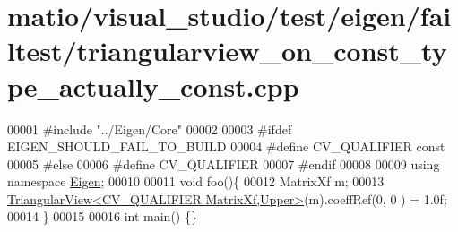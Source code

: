 \hypertarget{matio_2visual__studio_2test_2eigen_2failtest_2triangularview__on__const__type__actually__const_8cpp_source}{}\section{matio/visual\+\_\+studio/test/eigen/failtest/triangularview\+\_\+on\+\_\+const\+\_\+type\+\_\+actually\+\_\+const.cpp}
\label{matio_2visual__studio_2test_2eigen_2failtest_2triangularview__on__const__type__actually__const_8cpp_source}

\begin{DoxyCode}
00001 \textcolor{preprocessor}{#include "../Eigen/Core"}
00002 
00003 \textcolor{preprocessor}{#ifdef EIGEN\_SHOULD\_FAIL\_TO\_BUILD}
00004 \textcolor{preprocessor}{#define CV\_QUALIFIER const}
00005 \textcolor{preprocessor}{#else}
00006 \textcolor{preprocessor}{#define CV\_QUALIFIER}
00007 \textcolor{preprocessor}{#endif}
00008 
00009 \textcolor{keyword}{using namespace }\hyperlink{namespace_eigen}{Eigen};
00010 
00011 \textcolor{keywordtype}{void} foo()\{
00012     MatrixXf m;
00013     \hyperlink{group___core___module_class_eigen_1_1_triangular_view}{TriangularView<CV\_QUALIFIER MatrixXf,Upper>}(m).coeffRef(0, 0
      ) = 1.0f;
00014 \}
00015 
00016 \textcolor{keywordtype}{int} main() \{\}
\end{DoxyCode}
